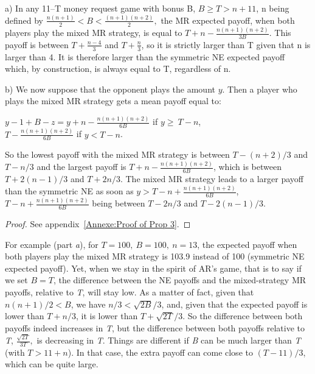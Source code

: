 \begin{Article}
\begin{refsection}[Umbhauer]

\begin{proposition}

a) In any 11--T money request game with bonus B,
\(B \geq T > n + 11\), n being defined by
\(\frac{n(n + 1)}{2} < B < \frac{(n + 1)(n + 2)}{2},\) the MR
expected payoff, when both players play the mixed MR strategy, is equal
to \(T + n - \frac{n(n + 1)(n + 2)}{3B}\). This payoff is
between \(T + \frac{n - 4}{3}\) and \(T + \frac{n}{3}\),
so it is strictly larger than T given that n is larger than 4. It is
therefore larger than the symmetric NE expected payoff which, by
construction, is always equal to T, regardless of n.

b) We now suppose that the opponent plays the amount \(y\). Then a player who plays the mixed MR strategy gets a mean payoff equal to:

{\centering
\(y - 1 + B - z = y + n - \frac{n(n + 1)(n + 2)}{6B}\) if \(y \geq \ T - n\),\\
\(T - \frac{n(n + 1)(n + 2)}{6B}\) if \(y < T - n\).\par}

So the lowest payoff with the mixed MR strategy is between \(T - (n + 2)/3\) and \(T - n/3\) and the largest payoff is \(T + n - \frac{n(n + 1)(n + 2)}{6B}\), which is between \(T + 2(n - 1)/3\) and \(T + 2n/3\). The mixed MR strategy leads to a larger payoff than the symmetric NE as soon as \(y > T - n + \frac{n(n + 1)(n + 2)}{6B}\), \(T - n + \frac{n(n + 1)(n + 2)}{6B}\) being between \(T - 2n/3\) and \(T - 2(n - 1)/3\). 
\end{proposition}

\begin{proof}
    See appendix~\ref{Annexe:Proof of Prop 3}. \quad \blacksquare
\end{proof}

\vspace{0.5cm}
For example (part \emph{a}), for \(T = 100,\ B = 100,\ n = 13\), the
expected payoff when both players play the mixed MR strategy is 103.9
instead of 100 (symmetric NE expected payoff). Yet, when we stay in the
spirit of AR's game, that is to say if we set \(B = T\), the difference
between the NE payoffs and the mixed-strategy MR payoffs, relative to \emph{T},
will stay low. As a matter of fact, given that \(n(n + 1)/2 < B\), we
have \(n/3 < \sqrt{2B}/3\), and, given that the expected payoff is lower
than \(T + n/3\), it is lower than \(T + \sqrt{2T}/3\). So the
difference between both payoffs indeed increases in \emph{T}, but the
difference between both payoffs relative to \emph{T},
\(\frac{\sqrt{2T}}{3T},\) is decreasing in \emph{T}. Things are
different if \emph{B} can be much larger than \emph{T} (with
\(T > 11 + n\)). In that case, the extra payoff can come close to
\((T - 11)/3\), which can be quite large.


\end{refsection}
\end{Article}
